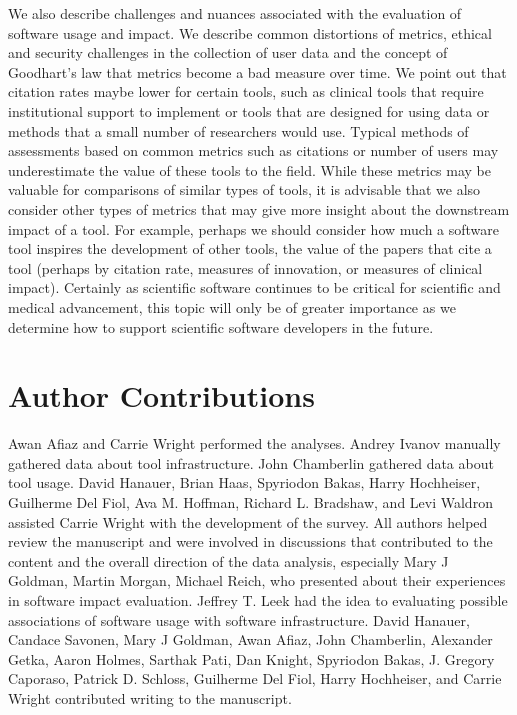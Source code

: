 \documentclass{article}
\begin{document}
We also describe challenges and nuances associated with the evaluation of software usage and impact. We describe common distortions of metrics, ethical and security challenges in the collection of user data and the concept of Goodhart's law that metrics become a bad measure over time. We point out that citation rates maybe lower for certain tools, such as clinical tools that require institutional support to implement or tools that are designed for using data or methods that a small number of researchers would use. Typical methods of assessments based on common metrics such as citations or number of users may underestimate the value of these tools to the field. While these metrics may be valuable for comparisons of similar types of tools, it is advisable that we also consider other types of metrics that may give more insight about the downstream impact of a tool. For example, perhaps we should consider how much a software tool inspires the development of other tools, the value of the papers that cite a tool (perhaps by citation rate, measures of innovation, or measures of clinical impact). Certainly as scientific software continues to be critical for scientific and medical advancement, this topic will only be of greater importance as we determine how to support scientific software developers in the future. 
 
 
\section{Author Contributions}


Awan Afiaz and Carrie Wright performed the analyses. Andrey Ivanov manually gathered data about tool infrastructure. John Chamberlin gathered data about tool usage. David Hanauer, Brian Haas, Spyriodon Bakas, Harry Hochheiser, Guilherme Del Fiol, Ava M. Hoffman, Richard L. Bradshaw, and Levi Waldron assisted Carrie Wright with the development of the survey.  All authors helped review the manuscript and were involved in discussions that contributed to the content and the overall direction of the data analysis, especially Mary J Goldman, Martin Morgan, Michael Reich, who presented about their experiences in software impact evaluation. Jeffrey T. Leek had the idea to  evaluating possible associations of software usage with software infrastructure. David Hanauer, Candace Savonen, Mary J Goldman, Awan Afiaz, John Chamberlin, Alexander Getka, Aaron Holmes, Sarthak Pati, Dan Knight,  Spyriodon Bakas, J. Gregory Caporaso, Patrick D. Schloss, Guilherme Del Fiol, Harry Hochheiser, and Carrie Wright contributed writing to the manuscript. 
\end{document}
